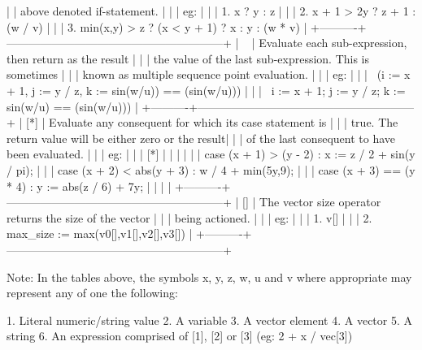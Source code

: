 |          | above denoted if-statement.                             |
|          | eg:                                                     |
|          | 1. x ? y : z                                            |
|          | 2. x + 1 > 2y ? z + 1 : (w / v)                         |
|          | 3. min(x,y) > z ? (x < y + 1) ? x : y : (w * v)         |
+----------+---------------------------------------------------------+
| ~        | Evaluate each sub-expression, then return as the result |
|          | the value of the last sub-expression. This is sometimes |
|          | known as multiple sequence point evaluation.            |
|          | eg:                                                     |
|          | ~(i := x + 1, j := y / z, k := sin(w/u)) == (sin(w/u))) |
|          | ~{i := x + 1; j := y / z; k := sin(w/u)} == (sin(w/u))) |
+----------+---------------------------------------------------------+
| [*]      | Evaluate any consequent for which its case statement is |
|          | true. The return value will be either zero or the result|
|          | of the last consequent to have been evaluated.          |
|          | eg:                                                     |
|          | [*]                                                     |
|          | {                                                       |
|          |   case (x + 1) > (y - 2)    : x := z / 2 + sin(y / pi); |
|          |   case (x + 2) < abs(y + 3) : w / 4 + min(5y,9);        |
|          |   case (x + 3) == (y * 4)   : y := abs(z / 6) + 7y;     |
|          | }                                                       |
+----------+---------------------------------------------------------+
| []       | The vector size operator returns the size of the vector |
|          | being actioned.                                         |
|          | eg:                                                     |
|          | 1. v[]                                                  |
|          | 2. max\_size := max(v0[],v1[],v2[],v3[])                 |
+----------+---------------------------------------------------------+

Note: In  the  tables  above, the  symbols x, y, z, w, u  and v  where
appropriate may represent any of one the following:

1. Literal numeric/string value
2. A variable
3. A vector element
4. A vector
5. A string
6. An expression comprised of [1], [2] or [3] (eg: 2 + x / vec[3])

~~~~~~~~~~~~~~~~~~~~~~~~~~~~~~~~~~~~~~~~~~~~~~~~~~~~~~~~~~

